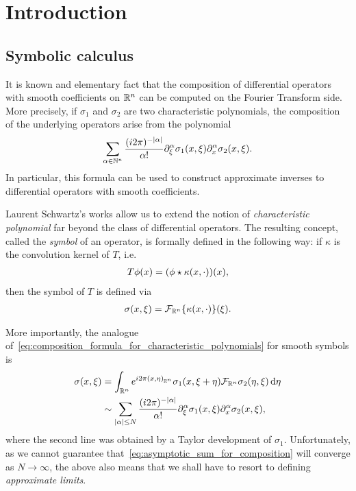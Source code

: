 \chapter{Introduction}

\section{Symbolic calculus}

It is known and elementary fact that
the composition of differential operators with smooth coefficients on $\R^n$ can be computed on the Fourier Transform side.
More precisely,
if $\sigma_1$ and $\sigma_2$ are two characteristic polynomials,
the composition of the underlying operators arise from the polynomial
\begin{align}
    \sum_{\alpha \in \N^n} \frac {(\i \turn)^{-\abs \alpha}} {\alpha!} \iD{\xi^\alpha} \sigma_1(x, \xi) \iD{x^\alpha} \sigma_2(x, \xi)
    \label{eq:composition_formula_for_characteristic_polynomials}.
\end{align}
In particular,
this formula can be used to construct approximate inverses to differential operators with smooth coefficients.

Laurent Schwartz's works allow us to extend the notion of \emph{characteristic polynomial} far beyond the class of differential operators.
The resulting concept,
called the \emph{symbol} of an operator,
is formally defined in the following way:
if $\kappa$ is the convolution kernel of $T$, i.e.\
\begin{align*}
    T \phi(x) = (\conv \phi {\kappa(x, \dummy)})(x),
\end{align*}
then the symbol of $T$ is defined via
\begin{align*}
    \sigma(x, \xi) = \Fourier [\R^n] \{\kappa(x, \dummy)\}(\xi).
\end{align*}

More importantly,
the analogue of~\eqref{eq:composition_formula_for_characteristic_polynomials} for smooth symbols is
\begin{align}
    \sigma(x, \xi)
    &= \int_{\R^n} \e^{\i \turn \ip [\R^n] x \eta} \sigma_1(x, \xi + \eta) \Fourier [\R^n] \sigma_2(\eta, \xi) \dd \eta \notag\\
    &\sim \sum_{\abs \alpha \leq N} \frac {(\i \turn)^{-\abs \alpha}} {\alpha!} \iD{\xi^\alpha} \sigma_1(x, \xi) \iD{x^\alpha} \sigma_2(x, \xi),
    \label{eq:asymptotic_sum_for_composition}
\end{align}
where the second line was obtained by a Taylor development of $\sigma_1$.
Unfortunately,
as we cannot guarantee that~\eqref{eq:asymptotic_sum_for_composition} will converge as $N \to \infty$,
the above also means that we shall have to resort to defining \emph{approximate limits}.


